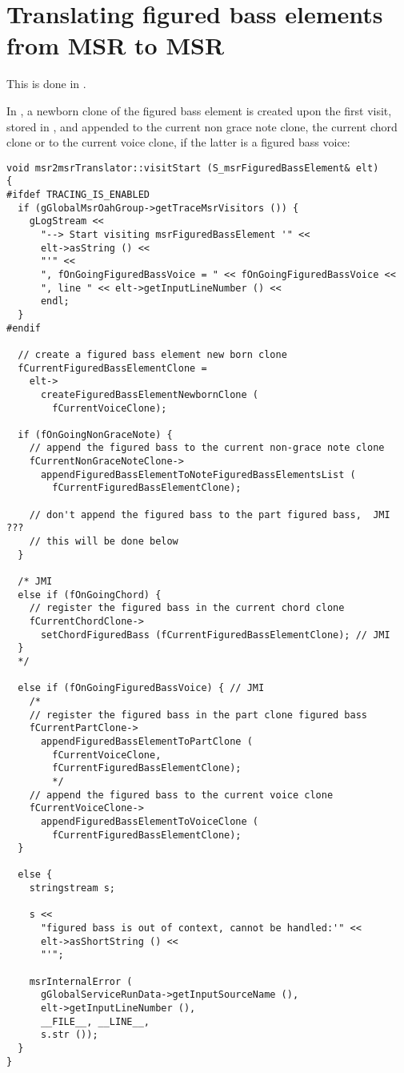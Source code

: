 \section{Translating figured bass elements from MSR to MSR}

This is done in \msrToMsr{}.

In , a newborn clone of the figured bass element is created upon the first visit, stored in , and appended to the current non grace note clone, the current chord clone or to the current voice clone, if the latter is a figured bass voice: %
\begin{lstlisting}[language=CPlusPlus]
void msr2msrTranslator::visitStart (S_msrFiguredBassElement& elt)
{
#ifdef TRACING_IS_ENABLED
  if (gGlobalMsrOahGroup->getTraceMsrVisitors ()) {
    gLogStream <<
      "--> Start visiting msrFiguredBassElement '" <<
      elt->asString () <<
      "'" <<
      ", fOnGoingFiguredBassVoice = " << fOnGoingFiguredBassVoice <<
      ", line " << elt->getInputLineNumber () <<
      endl;
  }
#endif

  // create a figured bass element new born clone
  fCurrentFiguredBassElementClone =
    elt->
      createFiguredBassElementNewbornClone (
        fCurrentVoiceClone);

  if (fOnGoingNonGraceNote) {
    // append the figured bass to the current non-grace note clone
    fCurrentNonGraceNoteClone->
      appendFiguredBassElementToNoteFiguredBassElementsList (
      	fCurrentFiguredBassElementClone);

    // don't append the figured bass to the part figured bass,  JMI ???
    // this will be done below
  }

  /* JMI
  else if (fOnGoingChord) {
    // register the figured bass in the current chord clone
    fCurrentChordClone->
      setChordFiguredBass (fCurrentFiguredBassElementClone); // JMI
  }
  */

  else if (fOnGoingFiguredBassVoice) { // JMI
    /*
    // register the figured bass in the part clone figured bass
    fCurrentPartClone->
      appendFiguredBassElementToPartClone (
        fCurrentVoiceClone,
        fCurrentFiguredBassElementClone);
        */
    // append the figured bass to the current voice clone
    fCurrentVoiceClone->
      appendFiguredBassElementToVoiceClone (
        fCurrentFiguredBassElementClone);
  }

  else {
    stringstream s;

    s <<
      "figured bass is out of context, cannot be handled:'" <<
      elt->asShortString () <<
      "'";

    msrInternalError (
      gGlobalServiceRunData->getInputSourceName (),
      elt->getInputLineNumber (),
      __FILE__, __LINE__,
      s.str ());
  }
}
\end{lstlisting}

